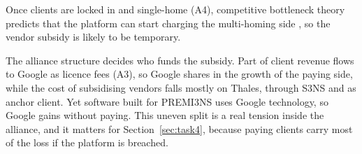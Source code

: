 Once clients are locked in and single-home (A4), competitive bottleneck theory predicts that the platform can start charging the multi-homing side \parencite{armstrong2006}, so the vendor subsidy is likely to be temporary.

The alliance structure decides who funds the subsidy. Part of client revenue flows to Google as licence fees (A3), so Google shares in the growth of the paying side, while the cost of subsidising vendors falls mostly on Thales, through S3NS and as anchor client. Yet software built for PREMI3NS uses Google technology, so Google gains without paying. This uneven split is a real tension inside the alliance, and it matters for Section~\ref{sec:task4}, because paying clients carry most of the loss if the platform is breached.

